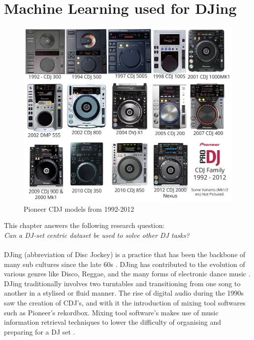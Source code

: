 
\graphicspath{{Chapter3/}}

\chapter{Machine Learning used for DJing}

\begin{figure}[H]
	\includegraphics[scale=0.3]{images/pioneers_history}
	\centering
	\caption{Pioneer CDJ models from 1992-2012 \citep{chesters_history_2017}} 
\end{figure}

This chapter answers the following research question:
\\

\textit{Can a DJ-set centric dataset be used to solve other DJ tasks?} 
\\
\\
DJing (abbreviation of Disc Jockey) is a practice that has been the backbone of many sub cultures since the late 60s \citep{brewster_last_2014}. DJing has contributed to the evolution of various genres like Disco, Reggae, and the many forms of electronic dance music \citep{partridge_dub_2010, reynolds_energy_2013}. DJing traditionally involves two turntables and transitioning from one song to another in a stylised or fluid manner. The rise of digital audio during the 1990s saw the creation of CDJ's, and with it the introduction of mixing tool softwares such as Pioneer's rekordbox. Mixing tool software's makes use of music information retrieval techniques to lower the difficulty of organising and preparing for a DJ set \citep{kim_automatic_2017}. 

